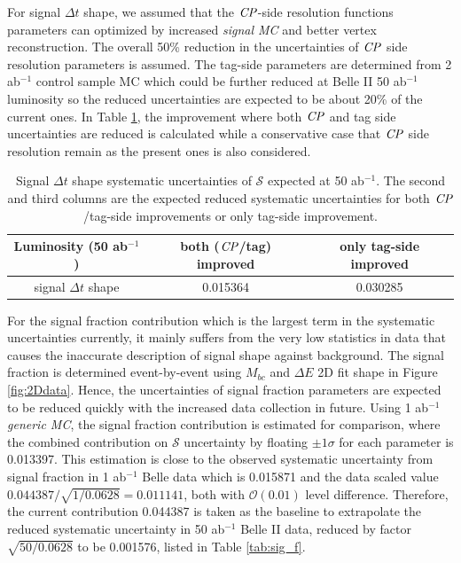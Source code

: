 For signal $\Delta t$ shape, we assumed that the $\it{CP}$-side resolution functions parameters can optimized by increased \textit{signal MC} and better vertex reconstruction. The overall 50\% reduction in the uncertainties of $\it{CP}$ side resolution parameters is assumed. The tag-side parameters are determined from 2 ab$^{-1}$ control sample MC which could be further reduced at Belle II  50 ab$^{-1}$ luminosity so the reduced uncertainties are expected to be about 20\% of the current ones. In Table  \ref{tab:sig_shape}, the improvement where both $\it{CP}$ and tag side uncertainties are reduced is calculated while a conservative case that $\it{CP}$ side resolution remain as the present ones is also considered.
\begin{table}[H]
		\centering
		\caption{ Signal $\Delta t$ shape systematic uncertainties of $\mathcal{S}$ expected at 50 ab$^{-1}$. The second and third columns are the expected reduced systematic uncertainties for both $\it{CP}$/tag-side improvements or only tag-side improvement.}
		\label{tab:sig_shape}
		\begin{tabular}{c| c| c }
			\hline
			Luminosity (50 ab$^{-1}$) & both ($\it{CP}$/tag) improved & only tag-side improved \\
			\hline
			signal $\Delta t$ shape &  0.015364 & 0.030285\\
			\hline
		\end{tabular}
\end{table}

For the signal fraction contribution which is the largest term in the systematic uncertainties currently, it mainly suffers from the very low statistics in data that causes the inaccurate description of signal shape against background. The signal fraction is determined event-by-event using $M_{bc}$ and $\Delta E$ 2D fit shape in Figure \ref{fig:2Ddata}. Hence, the uncertainties of signal fraction parameters are expected to be reduced quickly with the increased data collection in future. Using 1 ab$^{-1}$ \textit{generic MC}, the signal fraction contribution is estimated for comparison, where the combined contribution on $\mathcal{S}$ uncertainty by floating $\pm 1 \sigma$ for each parameter is 0.013397. This estimation is close to the observed systematic uncertainty from signal fraction in 1 ab$^{-1}$ Belle data which is 0.015871\cite{kang2020measurement} and the data scaled value $0.044387/\sqrt{1/0.0628}=0.011141$, both with $\mathcal{O}(0.01)$ level difference. Therefore, the current contribution 0.044387 is taken as the baseline to extrapolate the reduced systematic uncertainty in 50 ab$^{-1}$ Belle II data, reduced by factor $\sqrt{50/0.0628}$ to be 0.001576, listed in Table \ref{tab:sig_f}.

